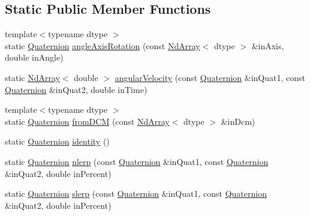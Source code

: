 \subsection*{Static Public Member Functions}
\begin{DoxyCompactItemize}
\item 
{\footnotesize template$<$typename dtype $>$ }\\static \mbox{\hyperlink{class_num_cpp_1_1_rotations_1_1_quaternion}{Quaternion}} \mbox{\hyperlink{class_num_cpp_1_1_rotations_1_1_quaternion_a6da99fa20889740318ea7f1937804089}{angle\+Axis\+Rotation}} (const \mbox{\hyperlink{class_num_cpp_1_1_nd_array}{Nd\+Array}}$<$ dtype $>$ \&in\+Axis, double in\+Angle)
\item 
static \mbox{\hyperlink{class_num_cpp_1_1_nd_array}{Nd\+Array}}$<$ double $>$ \mbox{\hyperlink{class_num_cpp_1_1_rotations_1_1_quaternion_a0dac9684e14722df14519657d1470303}{angular\+Velocity}} (const \mbox{\hyperlink{class_num_cpp_1_1_rotations_1_1_quaternion}{Quaternion}} \&in\+Quat1, const \mbox{\hyperlink{class_num_cpp_1_1_rotations_1_1_quaternion}{Quaternion}} \&in\+Quat2, double in\+Time)
\item 
{\footnotesize template$<$typename dtype $>$ }\\static \mbox{\hyperlink{class_num_cpp_1_1_rotations_1_1_quaternion}{Quaternion}} \mbox{\hyperlink{class_num_cpp_1_1_rotations_1_1_quaternion_a4589fd8623eb308578a9888cf541cc5a}{from\+D\+CM}} (const \mbox{\hyperlink{class_num_cpp_1_1_nd_array}{Nd\+Array}}$<$ dtype $>$ \&in\+Dcm)
\item 
static \mbox{\hyperlink{class_num_cpp_1_1_rotations_1_1_quaternion}{Quaternion}} \mbox{\hyperlink{class_num_cpp_1_1_rotations_1_1_quaternion_a55f3aeaaf13db905717f1c3de476a921}{identity}} ()
\item 
static \mbox{\hyperlink{class_num_cpp_1_1_rotations_1_1_quaternion}{Quaternion}} \mbox{\hyperlink{class_num_cpp_1_1_rotations_1_1_quaternion_ad3230f7957b05e62300b1da3a6bbb75f}{nlerp}} (const \mbox{\hyperlink{class_num_cpp_1_1_rotations_1_1_quaternion}{Quaternion}} \&in\+Quat1, const \mbox{\hyperlink{class_num_cpp_1_1_rotations_1_1_quaternion}{Quaternion}} \&in\+Quat2, double in\+Percent)
\item 
static \mbox{\hyperlink{class_num_cpp_1_1_rotations_1_1_quaternion}{Quaternion}} \mbox{\hyperlink{class_num_cpp_1_1_rotations_1_1_quaternion_a376b92643574eaecf93ea59540f461ae}{slerp}} (const \mbox{\hyperlink{class_num_cpp_1_1_rotations_1_1_quaternion}{Quaternion}} \&in\+Quat1, const \mbox{\hyperlink{class_num_cpp_1_1_rotations_1_1_quaternion}{Quaternion}} \&in\+Quat2, double in\+Percent)

\end{DoxyCompactItemize}

